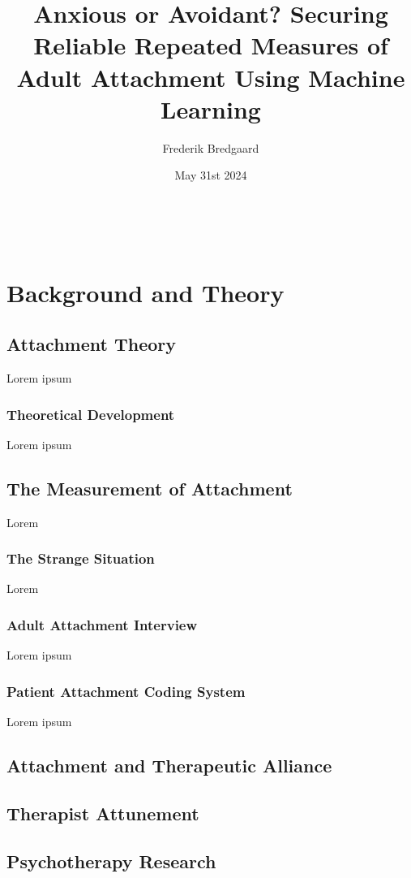 \documentclass[12pt]{report}
\title{Anxious or Avoidant? Securing Reliable Repeated Measures of Adult Attachment Using Machine Learning}
\author{Frederik Bredgaard}
\date{May 31st 2024}
\begin{document}
\maketitle
\
\tableofcontents

\chapter{Background and Theory}


\section{Attachment Theory}
Lorem ipsum

\subsection{Theoretical Development}
Lorem ipsum

\section{The Measurement of Attachment}
Lorem

\subsection{The Strange Situation}
Lorem

\subsection{Adult Attachment Interview}
Lorem ipsum

\subsection{Patient Attachment Coding System}
Lorem ipsum \cite{Talia2017,Talia2020}

\section{Attachment and Therapeutic Alliance}

\section{Therapist Attunement}

\section{Psychotherapy Research}
\end{document}
